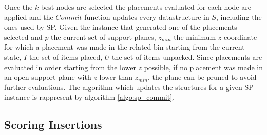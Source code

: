 

Once the $k$ best nodes are selected the placements evaluated for each node are applied and the $Commit$ function updates every datastructure in $S$, including the ones used by SP.
Given the instance that generated one of the placements selected and $p$ the current set of support planes, $z_{min}$ the minimum $z$ coordinate for which a placement was made in the related bin starting from the current state, $I$ the set of items placed, $U$ the set of items unpacked.
Since placements are evaluated in order starting from the lower $z$ possible, if no placement was made in an open support plane with $z$ lower than $z_{min}$, the plane can be pruned to avoid further evaluations.
The algorithm which updates the structures for a given SP instance is rappresent by algorithm \ref{algo:sp_commit}.



\subsection{Scoring Insertions}
\label{ssec:scoring_insertions}%